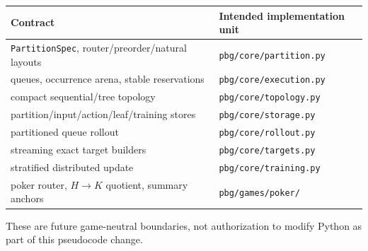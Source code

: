 \documentclass[10pt,a4paper]{article}
\newcommand{\Obj}[1]{\texttt{#1}}
\begin{document}
\begin{center}
\begin{tabular}{ll}
\toprule
Contract & Intended implementation unit \\
\midrule
\Obj{PartitionSpec}, router/preorder/natural layouts & \texttt{pbg/core/partition.py} \\
queues, occurrence arena, stable reservations & \texttt{pbg/core/execution.py} \\
compact sequential/tree topology & \texttt{pbg/core/topology.py} \\
partition/input/action/leaf/training stores & \texttt{pbg/core/storage.py} \\
partitioned queue rollout & \texttt{pbg/core/rollout.py} \\
streaming exact target builders & \texttt{pbg/core/targets.py} \\
stratified distributed update & \texttt{pbg/core/training.py} \\
poker router, $H\to K$ quotient, summary anchors & \texttt{pbg/games/poker/} \\
\bottomrule
\end{tabular}
\end{center}

These are future game-neutral boundaries, not authorization to modify Python
as part of this pseudocode change.
\end{document}

